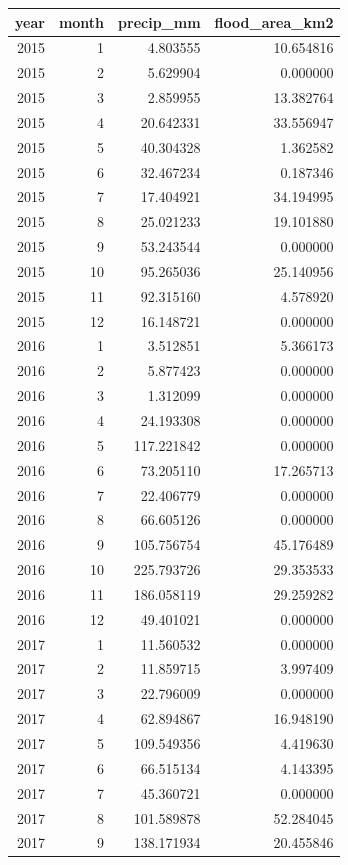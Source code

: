 \begin{tabular}{rrrr}
\toprule
year & month & precip\_mm & flood\_area\_km2 \\
\midrule
2015 & 1 & 4.803555 & 10.654816 \\
2015 & 2 & 5.629904 & 0.000000 \\
2015 & 3 & 2.859955 & 13.382764 \\
2015 & 4 & 20.642331 & 33.556947 \\
2015 & 5 & 40.304328 & 1.362582 \\
2015 & 6 & 32.467234 & 0.187346 \\
2015 & 7 & 17.404921 & 34.194995 \\
2015 & 8 & 25.021233 & 19.101880 \\
2015 & 9 & 53.243544 & 0.000000 \\
2015 & 10 & 95.265036 & 25.140956 \\
2015 & 11 & 92.315160 & 4.578920 \\
2015 & 12 & 16.148721 & 0.000000 \\
2016 & 1 & 3.512851 & 5.366173 \\
2016 & 2 & 5.877423 & 0.000000 \\
2016 & 3 & 1.312099 & 0.000000 \\
2016 & 4 & 24.193308 & 0.000000 \\
2016 & 5 & 117.221842 & 0.000000 \\
2016 & 6 & 73.205110 & 17.265713 \\
2016 & 7 & 22.406779 & 0.000000 \\
2016 & 8 & 66.605126 & 0.000000 \\
2016 & 9 & 105.756754 & 45.176489 \\
2016 & 10 & 225.793726 & 29.353533 \\
2016 & 11 & 186.058119 & 29.259282 \\
2016 & 12 & 49.401021 & 0.000000 \\
2017 & 1 & 11.560532 & 0.000000 \\
2017 & 2 & 11.859715 & 3.997409 \\
2017 & 3 & 22.796009 & 0.000000 \\
2017 & 4 & 62.894867 & 16.948190 \\
2017 & 5 & 109.549356 & 4.419630 \\
2017 & 6 & 66.515134 & 4.143395 \\
2017 & 7 & 45.360721 & 0.000000 \\
2017 & 8 & 101.589878 & 52.284045 \\
2017 & 9 & 138.171934 & 20.455846 \\

\end{tabular}
